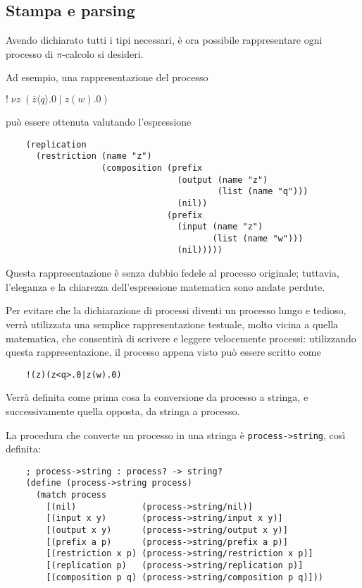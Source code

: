 \subsection{Stampa e parsing}

Avendo dichiarato tutti i tipi necessari, \`e ora possibile rappresentare
ogni processo di $\pi$-calcolo si desideri.

Ad esempio, una rappresentazione del processo

\begin{pilisting}
$
    ! \; \nu z \; (
      \overline{z}\langle q\rangle.0 \; | \;
      z(w).0
    )
$
\end{pilisting}

pu\`o essere ottenuta valutando l'espressione

\begin{lstlisting}
    (replication
      (restriction (name "z")
                   (composition (prefix
                                  (output (name "z")
                                          (list (name "q")))
                                  (nil))
                                (prefix
                                  (input (name "z")
                                         (list (name "w")))
                                  (nil)))))
\end{lstlisting}

Questa rappresentazione \`e senza dubbio fedele al processo originale;
tuttavia, l'eleganza e la chiarezza dell'espressione matematica sono
andate perdute.

Per evitare che la dichiarazione di processi diventi un processo lungo
e tedioso, verr\`a utilizzata una semplice rappresentazione testuale,
molto vicina a quella matematica, che consentir\`a di scrivere e leggere
velocemente processi: utilizzando questa rappresentazione, il processo
appena visto pu\`o essere scritto come

\begin{lstlisting}
    !(z)(z<q>.0|z(w).0)
\end{lstlisting}

Verr\`a definita come prima cosa la conversione da processo a stringa,
e successivamente quella opposta, da stringa a processo.

La procedura che converte un processo in una stringa \`e
\lstinline{process->string}, cos\`i definita:

\begin{lstlisting}
    ; process->string : process? -> string?
    (define (process->string process)
      (match process
        [(nil)             (process->string/nil)]
        [(input x y)       (process->string/input x y)]
        [(output x y)      (process->string/output x y)]
        [(prefix a p)      (process->string/prefix a p)]
        [(restriction x p) (process->string/restriction x p)]
        [(replication p)   (process->string/replication p)]
        [(composition p q) (process->string/composition p q)]))
\end{lstlisting}


